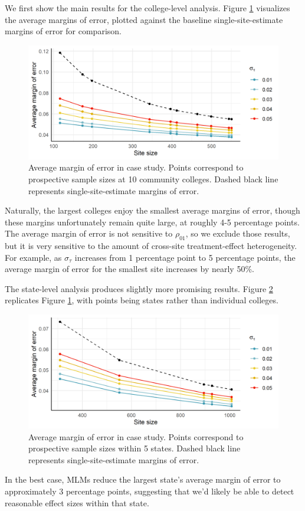 \documentclass[]{article}
\begin{document}
We first show the main results for the college-level analysis.
Figure \ref{fig:case_study_moe} visualizes the average margins of error, plotted against the baseline single-site-estimate margins of error for comparison.
\begin{figure}[ht]
    \centering
    \includegraphics[width=\textwidth]{writeup/images/case_study_moe.png}
    \caption{Average margin of error in case study. Points correspond to prospective sample sizes at 10 community colleges. Dashed black line represents single-site-estimate margins of error.}
    \label{fig:case_study_moe}
\end{figure}
Naturally, the largest colleges enjoy the smallest average margins of error, though these margins unfortunately remain quite large, at roughly 4-5 percentage points.
The average margin of error is not sensitive to $\rho_{01}$, so we exclude those results, but it is very sensitive to the amount of cross-site treatment-effect heterogeneity.
For example, as $\sigma_\tau$ increases from 1 percentage point to 5 percentage points, the average margin of error for the smallest site increases by nearly 50\%.

The state-level analysis produces slightly more promising results.
Figure \ref{fig:case_study_states_moe} replicates Figure \ref{fig:case_study_moe}, with points being states rather than individual colleges.
\begin{figure}[ht]
    \centering
    \includegraphics[width=\textwidth]{writeup/images/case_study_states_moe.png}
    \caption{Average margin of error in case study. Points correspond to prospective sample sizes within 5 states. Dashed black line represents single-site-estimate margins of error.}
    \label{fig:case_study_states_moe}
\end{figure}
In the best case, MLMs reduce the largest state's average margin of error to approximately 3 percentage points, suggesting that we'd likely be able to detect reasonable effect sizes within that state.
\end{document}

